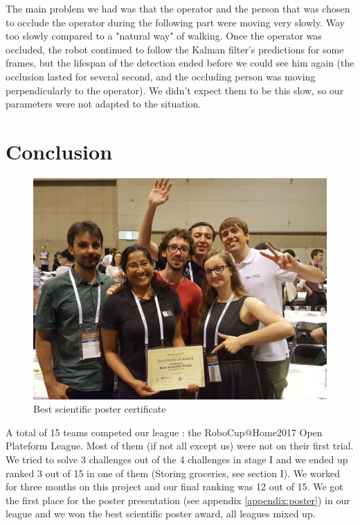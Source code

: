\documentclass[a4paper, twocolumn]{article}
\begin{document}
    The main problem we had was that the operator and the person that was chosen to occlude the operator during the following part were moving very slowly. Way too slowly compared to a "natural way" of walking. Once the operator was occluded, the robot continued to follow the Kalman filter's predictions for some frames, but the lifespan of the detection ended before we could see him again (the occlusion lasted for several second, and the occluding person was moving perpendicularly to the operator). We didn't expect them to be this slow, so our parameters were not adapted to the situation.

    \section*{Conclusion}

    \begin{figure}[!b]
        \includegraphics[width=\columnwidth]{../img/certificate.jpg}
        \caption{Best scientific poster certificate}
        \label{certificate}
    \end{figure}

    A total of 15 teams competed our league : the RoboCup@Home2017 Open Plateform League. Most of them (if not all except us) were not on their first trial. We tried to solve 3 challenges out of the 4 challenges in stage I and we ended up ranked 3 out of 15 in one of them (Storing groceries, see section I). We worked for three months on this project and our final ranking was 12 out of 15. We got the first place for the poster presentation (see appendix \ref{appendix:poster}) in our league and we won the best scientific poster award, all leagues mixed up.
\end{document}
